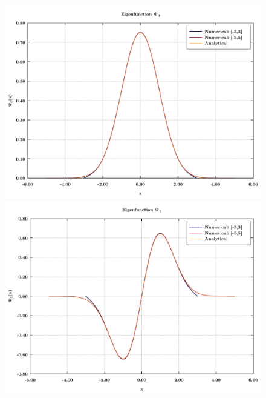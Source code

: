 \documentclass[rmp,10pt,onecolumn,fleqn,notitlepage]{revtex4-1}
\begin{document}
\begin{figure}[h!]
\begin{minipage}[c]{0.48\linewidth}
\centering
\includegraphics[width=1\textwidth]{image/eig_func_1.pdf}
\end{minipage}
\begin{minipage}[]{0.48\linewidth}
\centering
\includegraphics[width=1\textwidth]{image/eig_func_2.pdf}
\end{minipage} \\
\begin{minipage}[c]{0.48\linewidth}
\centering

\end{minipage}
\end{figure}
\end{document}
